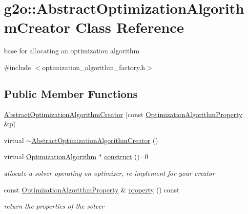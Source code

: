 \hypertarget{classg2o_1_1_abstract_optimization_algorithm_creator}{}\section{g2o\+:\+:Abstract\+Optimization\+Algorithm\+Creator Class Reference}
\label{classg2o_1_1_abstract_optimization_algorithm_creator}


base for allocating an optimization algorithm  




{\ttfamily \#include $<$optimization\+\_\+algorithm\+\_\+factory.\+h$>$}

\subsection*{Public Member Functions}
\begin{DoxyCompactItemize}
\item 
\mbox{\hyperlink{classg2o_1_1_abstract_optimization_algorithm_creator_ae9f64a630d2e641043aabc98660495d8}{Abstract\+Optimization\+Algorithm\+Creator}} (const \mbox{\hyperlink{structg2o_1_1_optimization_algorithm_property}{Optimization\+Algorithm\+Property}} \&p)
\item 
virtual \mbox{\hyperlink{classg2o_1_1_abstract_optimization_algorithm_creator_a8832e6083876766797176fb0d93b4554}{$\sim$\+Abstract\+Optimization\+Algorithm\+Creator}} ()
\item 
virtual \mbox{\hyperlink{classg2o_1_1_optimization_algorithm}{Optimization\+Algorithm}} $\ast$ \mbox{\hyperlink{classg2o_1_1_abstract_optimization_algorithm_creator_a96a737bda0f932ac7dd51aa468795353}{construct}} ()=0
\begin{DoxyCompactList}\small\item\em allocate a solver operating on optimizer, re-\/implement for your creator \end{DoxyCompactList}\item 
const \mbox{\hyperlink{structg2o_1_1_optimization_algorithm_property}{Optimization\+Algorithm\+Property}} \& \mbox{\hyperlink{classg2o_1_1_abstract_optimization_algorithm_creator_ab074710276ea3496d5bff118e48c6030}{property}} () const
\begin{DoxyCompactList}\small\item\em return the properties of the solver \end{DoxyCompactList}\end{DoxyCompactItemize}
